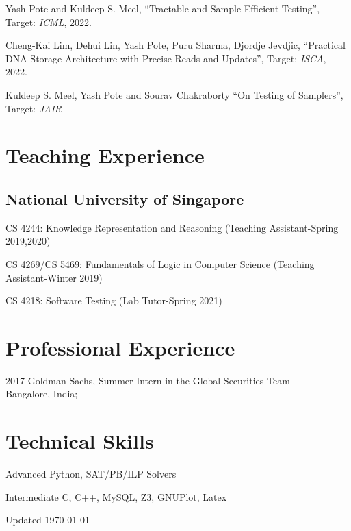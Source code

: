 \documentclass[12pt,letterpaper]{report}
\newcommand{\listitemspace}{0.15em}
\renewenvironment{itemize}
{\begin{list}{}{\setlength{\leftmargin}{0em}
            \setlength{\parskip}{0em}
            \setlength{\itemsep}{\listitemspace}
            \setlength{\parsep}{\listitemspace}}}
    {\end{list}}
\begin{document}
    \begin{tablist}

	

		\item[\the\year] \tab  Yash Pote  and Kuldeep S. Meel, \enquote{Tractable and Sample Efficient Testing}, Target: \textit{ICML},  2022.
		
		\item[\the\year] \tab  Cheng-Kai Lim, Dehui Lin, Yash Pote,  Puru Sharma, Djordje Jevdjic, \enquote{Practical DNA Storage Architecture with Precise Reads and
			Updates}, Target: \textit{ISCA},  2022.
	
		
		\item[\the\year] \tab Kuldeep S. Meel, Yash Pote  and Sourav Chakraborty \enquote{On Testing of Samplers}, Target: \textit{JAIR}
		

    \end{tablist}


    \section*{Teaching Experience}

    \subsection*{National University of Singapore}
    
    \begin{itemize}
    	  	
 \item   CS 4244: Knowledge Representation and Reasoning (Teaching Assistant-Spring 2019,2020)
  \item   CS 4269/CS 5469: Fundamentals of Logic in Computer Science (Teaching Assistant-Winter 2019)
  \item   CS 4218: Software Testing (Lab Tutor-Spring 2021)
    
	\end{itemize}
    
    \section*{Professional Experience}

    \begin{tablist}
        \item[2017] \tab Goldman Sachs, Summer Intern in the Global Securities Team\\
        Bangalore, India; 
    \end{tablist}
	\section*{Technical Skills}

	\begin{tablist}
		\item[Advanced] \tab Python, SAT/PB/ILP Solvers
		\item[Intermediate] \tab C, C++, MySQL, Z3, GNUPlot, Latex
	\end{tablist}
    \begin{center}
        \vfill
        Updated \monthyeardate\today
    \end{center}
\end{document}

